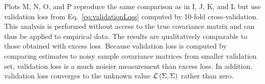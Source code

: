 Plots M, N, O, and P reproduce the same comparison as in I, J, K, and L but use validation loss from Eq.~\ref{eq:validationLoss} computed by 10-fold cross-validation.  This analysis is performed without access to the true covariance matrix and can thus be applied to empirical data.  The results are qualitatively comparable to those obtained with excess loss.  Because validation loss is computed by comparing estimates to noisy sample covariance matrices from smaller validation set, validation loss is a much noisier measurement than excess loss. In addition, validation loss converges to the unknown value $\mathcal L\left(\Sigma,\Sigma\right)$ rather than zero.
